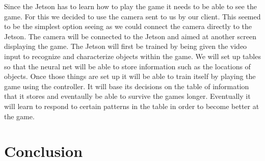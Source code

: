 \documentclass{scrreprt}
\begin{document}
Since the Jetson has to learn how to play the game it needs to be able to see the game.
For this we decided to use the camera sent to us by our client.
This seemed to be the simplest option seeing as we could connect the camera directly to the Jetson.
The camera will be connected to the Jetson and aimed at another screen displaying the game.
The Jetson will first be trained by being given the video input to recognize and characterize objects within the game.
We will set up tables so that the neural net will be able to store information such as the locations of objects.
Once those things are set up it will be able to train itself by playing the game using the controller.
It will base its decisions on the table of information that it stores and eventaully be able to survive the games longer.
Eventually it will learn to respond to certain patterns in the table in order to become better at the game.

\chapter{Conclusion}
\end{document}
